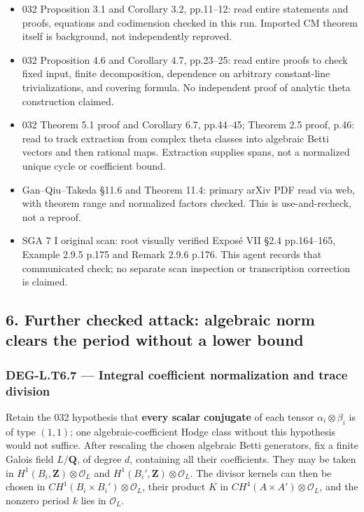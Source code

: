 \begin{itemize}
\tightlist
\item
  032 Proposition 3.1 and Corollary 3.2, pp.11--12: read entire statements and proofs, equations and codimension checked in this run. Imported CM theorem itself is background, not independently reproved.
\item
  032 Proposition 4.6 and Corollary 4.7, pp.23--25: read entire proofs to check fixed input, finite decomposition, dependence on arbitrary constant-line trivializations, and covering formula. No independent proof of analytic theta construction claimed.
\item
  032 Theorem 5.1 proof and Corollary 6.7, pp.44--45; Theorem 2.5 proof, p.46: read to track extraction from complex theta classes into algebraic Betti vectors and then rational maps. Extraction supplies spans, not a normalized unique cycle or coefficient bound.
\item
  Gan--Qiu--Takeda §11.6 and Theorem 11.4: primary arXiv PDF read via web, with theorem range and normalized factors checked. This is use-and-recheck, not a reproof.
\item
  SGA 7 I original scan: root visually verified Exposé VII §2.4 pp.164--165, Example 2.9.5 p.175 and Remark 2.9.6 p.176. This agent records that communicated check; no separate scan inspection or transcription correction is claimed.
\end{itemize}

\subsection{6. Further checked attack: algebraic norm clears the period without a lower bound}\label{further-checked-attack-algebraic-norm-clears-the-period-without-a-lower-bound}

\subsubsection{DEG-L.T6.7 --- Integral coefficient normalization and trace division}\label{DEG-L.T6.7}

Retain the 032 hypothesis that \textbf{every scalar conjugate} of each tensor \(\alpha_i\otimes\beta_i\) is of type \((1,1)\); one algebraic-coefficient Hodge class without this hypothesis would not suffice. After rescaling the chosen algebraic Betti generators, fix a finite Galois field \(L/\mathbf Q\), of degree \(d\), containing all their coefficients. They may be taken in \(H^1(B_i,\mathbf Z)\otimes\mathcal O_L\) and \(H^1(B_i',\mathbf Z)\otimes\mathcal O_L\). The divisor kernels can then be chosen in \(CH^1(B_i\times B_i')\otimes\mathcal O_L\), their product \(K\) in \(CH^4(A\times A')\otimes\mathcal O_L\), and the nonzero period \(k\) lies in \(\mathcal O_L\).

